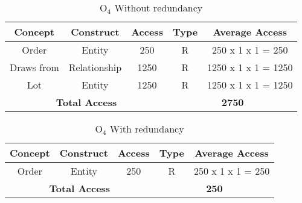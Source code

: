 \begin{table}[!h]\caption{	$ \textrm{O}_\textrm{4} $ Without redundancy }
	\begin{center}
		\begin{tabular}{| c | c | c | c | c |}
			\hline
			\textbf{Concept} & \textbf{Construct} & \textbf{Access} & \textbf{Type} & \textbf{Average Access} \\ \hline
			Order & Entity & 250 & R & 250 x 1 x 1 = 250 \\ \hline
			Draws from & Relationship & 1250 & R & 1250 x 1 x 1 = 1250 \\ \hline
			Lot & Entity & 1250 & R & 1250 x 1 x 1 = 1250 \\ \hline
			\multicolumn{3}{|c|}{\textbf{Total Access}} & \multicolumn{2}{|c|}{\textbf{2750}} \\ \hline
		\end{tabular}
	\end{center}
\end{table}
\begin{table}[!h]\caption{	$ \textrm{O}_\textrm{4} $ With redundancy }
	\begin{center}
		\begin{tabular}{| c | c | c | c | c |}
			\hline
			\textbf{Concept} & \textbf{Construct} & \textbf{Access} & \textbf{Type} & \textbf{Average Access} \\ \hline
			Order & Entity & 250 & R & 250 x 1 x 1 = 250 \\ \hline
			\multicolumn{3}{|c|}{\textbf{Total Access}} & \multicolumn{2}{|c|}{\textbf{250}} \\ \hline
		\end{tabular}
	\end{center}
\end{table}
